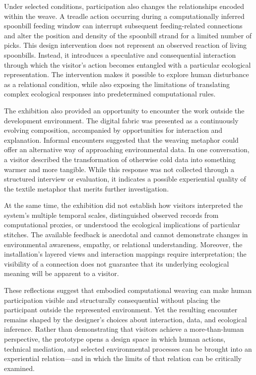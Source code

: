 \documentclass[manuscript,review,anonymous]{acmart}
\begin{document}
Under selected conditions, participation also changes the relationships encoded within the weave. A treadle action occurring during a computationally inferred spoonbill feeding window can interrupt subsequent feeding-related connections and alter the position and density of the spoonbill strand for a limited number of picks. This design intervention does not represent an observed reaction of living spoonbills. Instead, it introduces a speculative and consequential interaction through which the visitor's action becomes entangled with a particular ecological representation. The intervention makes it possible to explore human disturbance as a relational condition, while also exposing the limitations of translating complex ecological responses into predetermined computational rules.

The exhibition also provided an opportunity to encounter the work outside the development environment. The digital fabric was presented as a continuously evolving composition, accompanied by opportunities for interaction and explanation. Informal encounters suggested that the weaving metaphor could offer an alternative way of approaching environmental data. In one conversation, a visitor described the transformation of otherwise cold data into something warmer and more tangible. While this response was not collected through a structured interview or evaluation, it indicates a possible experiential quality of the textile metaphor that merits further investigation.

At the same time, the exhibition did not establish how visitors interpreted the system's multiple temporal scales, distinguished observed records from computational proxies, or understood the ecological implications of particular stitches. The available feedback is anecdotal and cannot demonstrate changes in environmental awareness, empathy, or relational understanding. Moreover, the installation's layered views and interaction mappings require interpretation; the visibility of a connection does not guarantee that its underlying ecological meaning will be apparent to a visitor.

These reflections suggest that embodied computational weaving can make human participation visible and structurally consequential without placing the participant outside the represented environment. Yet the resulting encounter remains shaped by the designer's choices about interaction, data, and ecological inference. Rather than demonstrating that visitors achieve a more-than-human perspective, the prototype opens a design space in which human actions, technical mediation, and selected environmental processes can be brought into an experiential relation—and in which the limits of that relation can be critically examined.
\end{document}

